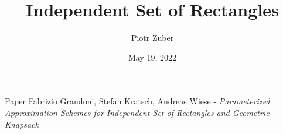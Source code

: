 \documentclass[handout,usenames,dvipsnames]{beamer}
\title{Independent Set of Rectangles} %
\author{Piotr Żuber} %
\institute[University of Warsaw] %
{
University of Warsaw
\\ %
\medskip
\textit{} %
}
\date{May 19, 2022} %
\begin{document}
\newtheorem{thm}{Theorem}
\newtheorem{defi}{Definition}
\newtheorem*{defi*}{Definition}
\newtheorem*{thm*}{Theorem}
\newtheorem{lm}{Lemma}
\newtheorem*{lm*}{Lemma}
\newtheorem{fakt}{Fact}
\newtheorem*{fakt*}{Fact}


\renewcommand{\a}{\alpha}
\newcommand{\e}{\varepsilon}
\newcommand{\E}{\mathbb{E}}
\renewcommand{\P}{\mathbb{P}}
\renewcommand{\b}{\beta}
\newcommand{\s}{\sigma}
\renewcommand{\S}{\Sigma}
\renewcommand{\t}{\tau}
\renewcommand{\t}{\theta}
\newcommand{\F}{\Phi}
\newcommand{\g}{\gamma}
\newcommand{\R}{\mathbb{R}}
\newcommand{\dis}{\displaystyle}
\newcommand{\vect}[1]{\textbf{#1}}
\newcommand{\maxnorm}[1]{\lVert #1 \rVert_{\infty}}
\newcommand{\norm}[1]{\lVert #1 \rVert}
\newcommand{\bigO}{\mathcal{O}}
\renewcommand{\figurename}{Figure}

\begin{frame}
\titlepage %
\end{frame}





\begin{frame}{Paper}
Fabrizio Grandoni, Stefan Kratsch, Andreas Wiese - 
\textit{Parameterized Approximation Schemes for Independent Set of Rectangles and Geometric Knapsack}
\end{frame}
\end{document}
